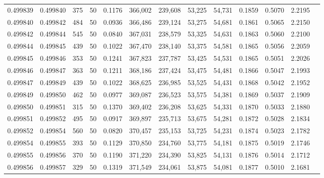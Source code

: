 \begin{tabular}{rrrrrrrrrrrrr}
0.499839 & 0.499840 & 375 &  50 &                                     0.1176 & 366,002 & 239,608 &  53,225 &  54,731 & 0.1859 & 0.5070 & 2.2195 \\
0.499840 & 0.499842 & 484 &  50 &                                     0.0936 & 366,486 & 239,124 &  53,275 &  54,681 & 0.1861 & 0.5065 & 2.2150 \\
0.499842 & 0.499844 & 545 &  50 &                                     0.0840 & 367,031 & 238,579 &  53,325 &  54,631 & 0.1863 & 0.5060 & 2.2100 \\
0.499844 & 0.499845 & 439 &  50 &                                     0.1022 & 367,470 & 238,140 &  53,375 &  54,581 & 0.1865 & 0.5056 & 2.2059 \\
0.499845 & 0.499846 & 353 &  50 &                                     0.1241 & 367,823 & 237,787 &  53,425 &  54,531 & 0.1865 & 0.5051 & 2.2026 \\
0.499846 & 0.499847 & 363 &  50 &                                     0.1211 & 368,186 & 237,424 &  53,475 &  54,481 & 0.1866 & 0.5047 & 2.1993 \\
0.499847 & 0.499849 & 439 &  50 &                                     0.1022 & 368,625 & 236,985 &  53,525 &  54,431 & 0.1868 & 0.5042 & 2.1952 \\
0.499849 & 0.499850 & 462 &  50 &                                     0.0977 & 369,087 & 236,523 &  53,575 &  54,381 & 0.1869 & 0.5037 & 2.1909 \\
0.499850 & 0.499851 & 315 &  50 &                                     0.1370 & 369,402 & 236,208 &  53,625 &  54,331 & 0.1870 & 0.5033 & 2.1880 \\
0.499851 & 0.499852 & 495 &  50 &                                     0.0917 & 369,897 & 235,713 &  53,675 &  54,281 & 0.1872 & 0.5028 & 2.1834 \\
0.499852 & 0.499854 & 560 &  50 &                                     0.0820 & 370,457 & 235,153 &  53,725 &  54,231 & 0.1874 & 0.5023 & 2.1782 \\
0.499854 & 0.499855 & 393 &  50 &                                     0.1129 & 370,850 & 234,760 &  53,775 &  54,181 & 0.1875 & 0.5019 & 2.1746 \\
0.499855 & 0.499856 & 370 &  50 &                                     0.1190 & 371,220 & 234,390 &  53,825 &  54,131 & 0.1876 & 0.5014 & 2.1712 \\
0.499856 & 0.499857 & 329 &  50 &                                     0.1319 & 371,549 & 234,061 &  53,875 &  54,081 & 0.1877 & 0.5010 & 2.1681 \\

\end{tabular}
